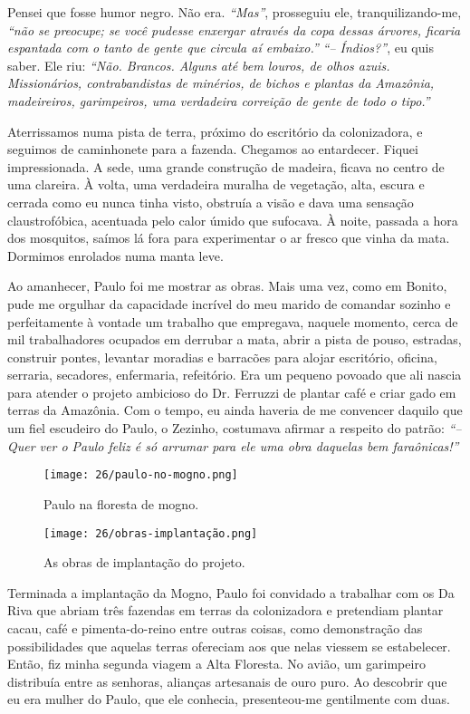 Pensei que fosse humor negro.
Não era.
\textit{``Mas''}, prosseguiu ele, tranquilizando-me, \textit{``não se preocupe; se você pudesse enxergar através da copa dessas árvores, ficaria espantada com o tanto de gente que circula aí embaixo.''}
\textit{``-- Índios?''}, eu quis saber.
Ele riu:
\textit{``Não.
Brancos.
Alguns até bem louros, de olhos azuis.
Missionários, contrabandistas de minérios, de bichos e plantas da Amazônia, madeireiros, garimpeiros, uma verdadeira correição de gente de todo o tipo.''}

Aterrissamos numa pista de terra, próximo do escritório da colonizadora, e seguimos de caminhonete para a fazenda.
Chegamos ao entardecer.
Fiquei impressionada.
A sede, uma grande construção de madeira, ficava no centro de uma clareira.
À volta, uma verdadeira muralha de vegetação, alta, escura e cerrada como eu nunca tinha visto, obstruía a visão e dava uma sensação claustrofóbica, acentuada pelo calor úmido que sufocava.
À noite, passada a hora dos mosquitos, saímos lá fora para experimentar o ar fresco que vinha da mata.
Dormimos enrolados numa manta leve.

Ao amanhecer, Paulo foi me mostrar as obras.
Mais uma vez, como em Bonito, pude me orgulhar da capacidade incrível do meu marido de comandar sozinho e perfeitamente à vontade um trabalho que empregava, naquele momento, cerca de mil trabalhadores ocupados em derrubar a mata, abrir a pista de pouso, estradas, construir pontes, levantar moradias e barracões para alojar escritório, oficina, serraria, secadores, enfermaria, refeitório.
Era um pequeno povoado que ali nascia para atender o projeto ambicioso do Dr.
Ferruzzi de plantar café e criar gado em terras da Amazônia.
Com o tempo, eu ainda haveria de me convencer daquilo que um fiel escudeiro do Paulo, o Zezinho, costumava afirmar a respeito do patrão:
\textit{``-- Quer ver o Paulo feliz é só arrumar para ele uma obra daquelas bem faraônicas!''}

\begin{figure}
\centering
\texttt{[image: 26/paulo-no-mogno.png]}
\caption{Paulo na floresta de mogno.}
\end{figure}

\begin{figure}
\centering
\texttt{[image: 26/obras-implantação.png]}
\caption{As obras de implantação do projeto.}
\end{figure}

Terminada a implantação da Mogno, Paulo foi convidado a trabalhar com os Da Riva que abriam três fazendas em terras da colonizadora e pretendiam plantar cacau, café e pimenta-do-reino entre outras coisas, como demonstração das possibilidades que aquelas terras ofereciam aos que nelas viessem se estabelecer.
Então, fiz minha segunda viagem a Alta Floresta.
No avião, um garimpeiro distribuía entre as senhoras, alianças artesanais de ouro puro.
Ao descobrir que eu era mulher do Paulo, que ele conhecia, presenteou-me gentilmente com duas.

